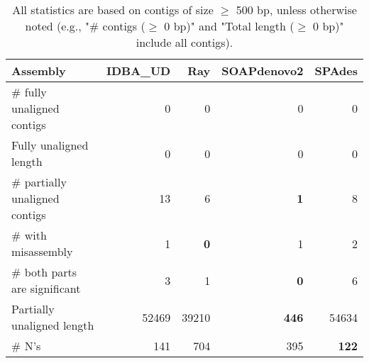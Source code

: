 \documentclass[12pt,a4paper]{article}
\begin{document}
\begin{table}[ht]
\begin{center}
\caption{All statistics are based on contigs of size $\geq$ 500 bp, unless otherwise noted (e.g., "\# contigs ($\geq$ 0 bp)" and "Total length ($\geq$ 0 bp)" include all contigs).}
\begin{tabular}{|l*{4}{|r}|}
\hline
Assembly & IDBA\_UD & Ray & SOAPdenovo2 & SPAdes \\ \hline
\# fully unaligned contigs & 0 & 0 & 0 & 0 \\ \hline
Fully unaligned length & 0 & 0 & 0 & 0 \\ \hline
\# partially unaligned contigs & 13 & 6 & {\bf 1} & 8 \\ \hline
\hspace{5mm}\# with misassembly & 1 & {\bf 0} & 1 & 2 \\ \hline
\hspace{5mm}\# both parts are significant & 3 & 1 & {\bf 0} & 6 \\ \hline
Partially unaligned length & 52469 & 39210 & {\bf 446} & 54634 \\ \hline
\# N's & 141 & 704 & 395 & {\bf 122} \\ \hline
\end{tabular}
\end{center}
\end{table}
\end{document}
